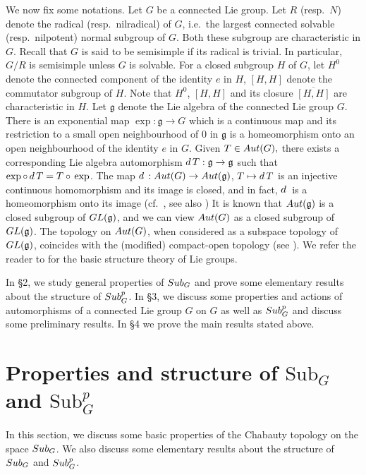 \documentclass{amsart}
\numberwithin{equation}{section}
\newcommand{\Aut}{{\rm Aut}}
\newcommand{\Sub}{{\rm Sub}}
\newcommand{\gf}{{\mathfrak g}}
\newcommand{\spg}{{\rm Sub}^p_G}
\newcommand{\du}{{\rm d\,}}
\newcommand{\GL}{{\rm GL}}
\let\ol=\overline
\theoremstyle{remark}
\begin{document}
We now fix some notations. Let $G$ be a connected Lie group. Let $R$ (resp.\ $N$) denote the radical (resp.\ nilradical) of $G$, 
i.e.\ the largest connected solvable (resp.\ nilpotent) normal subgroup of $G$. Both these subgroup are characteristic in $G$. 
Recall that $G$ is said to be semisimple if its radical is trivial. In particular, $G/R$ is semisimple unless $G$ is solvable. 
For a closed subgroup $H$ of $G$, 
let $H^0$ denote the connected component of the identity $e$ in $H$, $[H,H]$ denote the commutator subgroup of $H$. Note that 
 $H^0$, $[H,H]$ and its closure $\ol{[H,H]}$ are characteristic in $H$. Let $\gf$ denote the Lie algebra of the connected Lie group $G$. 
 There is an exponential map $\exp:\gf\to G$ which is a continuous map and its restriction to a small open 
 neighbourhood of $0$ in $\gf$ is a homeomorphism onto an open neighbourhood of the identity $e$ in $G$. 
 Given $T\in\Aut(G),$ there exists a corresponding Lie algebra automorphism 
 $\du T : \gf\to \gf$ such that $\exp\circ\,\du T =T\circ\,\exp$.  The map 
 $\du: \Aut(G) \rightarrow \Aut(\gf)$, $T \mapsto \du T$ is an injective continuous 
 homomorphism and its image is closed, and in fact, $\du$ is a homeomorphism onto its image 
 (cf.\ \cite{Ch}, see also \cite{Hoc})
It is known that $\Aut(\gf)$ is a closed subgroup of $\GL(\gf)$, and we can view $\Aut(G)$ 
as a closed subgroup of $\GL(\gf)$. The topology on $\Aut(G)$, when considered 
as a subspace topology of $\GL(\gf)$, coincides with the (modified) compact-open topology (see \cite{St06}). 
We refer the reader to \cite{Hoc2} for the basic structure theory of Lie groups.

In \S 2, we study general properties of $\Sub_G$ and prove some elementary results about the structure of $\spg$. 
In \S 3, we discuss some properties and actions of automorphisms of a connected Lie group $G$ on $G$ as well as 
$\spg$ and discuss some preliminary results. In \S4 we prove the main results stated above. 

\section{Properties and structure of \texorpdfstring{${\mathrm{Sub}}_G$}{Sub G} and 
\texorpdfstring{${\mathrm{Sub}}^p_G$}{Sub p G}}

In this section, we discuss some basic properties of the Chabauty topology on the space $\Sub_G$. 
We also discuss some elementary results about the structure of  $\Sub_G$ and $\spg$.
\end{document}
